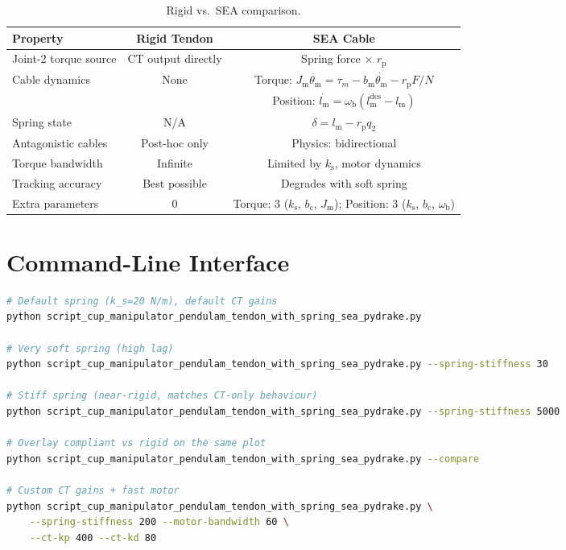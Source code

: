 \documentclass[11pt,a4paper]{article}
\newcommand{\rp}{r_{\mathrm{p}}}
\newcommand{\lm}{l_{\mathrm{m}}}
\newcommand{\ks}{k_{\mathrm{s}}}
\newcommand{\bc}{b_{\mathrm{c}}}
\newcommand{\wb}{\omega_{\mathrm{b}}}
\newcommand{\Jm}{J_{\mathrm{m}}}
\newcommand{\thetam}{\theta_{\mathrm{m}}}
\begin{document}
\begin{table}[H]
\centering
\caption{Rigid vs.\ SEA comparison.}
\begin{tabular}{lcc}
\toprule
\textbf{Property} & \textbf{Rigid Tendon} & \textbf{SEA Cable} \\
\midrule
Joint-2 torque source & CT output directly & Spring force $\times$ $\rp$ \\
Cable dynamics & None & Torque: $\Jm \ddot{\thetam} = \tau_m - b_{\mathrm{m}} \dot{\thetam} - \rp F/N$ \\
             &      & Position: $\dot{\lm} = \wb(\lm^{\mathrm{des}} - \lm)$ \\
Spring state & N/A & $\delta = \lm - \rp q_2$ \\
Antagonistic cables & Post-hoc only & Physics: bidirectional \\
Torque bandwidth & Infinite & Limited by $\ks$, motor dynamics \\
Tracking accuracy & Best possible & Degrades with soft spring \\
Extra parameters & 0 & Torque: 3 ($\ks$, $\bc$, $\Jm$); Position: 3 ($\ks$, $\bc$, $\wb$) \\
\bottomrule
\end{tabular}
\end{table}


\section{Command-Line Interface}
\label{sec:cli}

\begin{lstlisting}[language=bash, style=python, caption={Example usage.}]
# Default spring (k_s=20 N/m), default CT gains
python script_cup_manipulator_pendulam_tendon_with_spring_sea_pydrake.py

# Very soft spring (high lag)
python script_cup_manipulator_pendulam_tendon_with_spring_sea_pydrake.py --spring-stiffness 30

# Stiff spring (near-rigid, matches CT-only behaviour)
python script_cup_manipulator_pendulam_tendon_with_spring_sea_pydrake.py --spring-stiffness 5000

# Overlay compliant vs rigid on the same plot
python script_cup_manipulator_pendulam_tendon_with_spring_sea_pydrake.py --compare

# Custom CT gains + fast motor
python script_cup_manipulator_pendulam_tendon_with_spring_sea_pydrake.py \
    --spring-stiffness 200 --motor-bandwidth 60 \
    --ct-kp 400 --ct-kd 80
\end{lstlisting}
\end{document}
